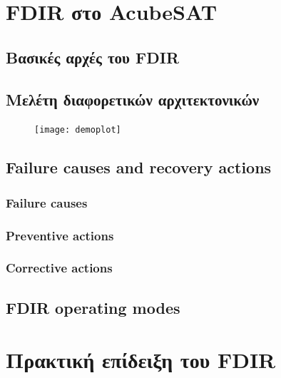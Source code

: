 \documentclass[a4paper,nobib]{tufte-book}
\begin{document}
\chapter{\ac{FDIR} στο AcubeSAT}
\label{cap:acufdir}

\section{Βασικές αρχές του \ac{FDIR}}


\section{Μελέτη διαφορετικών αρχιτεκτονικών}

\begin{figure}
	\centering
	\texttt{[image: demoplot]}
	\caption{}
\end{figure}

\FloatBarrier
\section{Failure causes and recovery actions}

\subsection{Failure causes}

\subsection{Preventive actions}

\subsection{Corrective actions}

\section{\ac{FDIR} operating modes}
\label{sec:fdir_operating_modes}

\chapter{Πρακτική επίδειξη του \ac{FDIR}}
\label{cap:practical}
\end{document}
